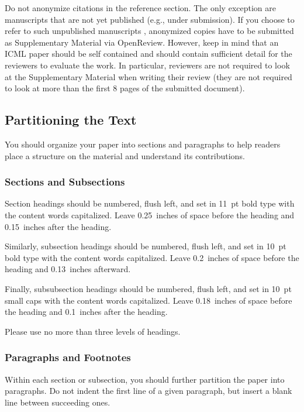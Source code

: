 \documentclass{article}
\theoremstyle{plain}
\theoremstyle{definition}
\theoremstyle{remark}
\begin{document}
Do not anonymize citations in the reference section. The only exception are manuscripts that are
not yet published (e.g., under submission). If you choose to refer to
such unpublished manuscripts \cite{anonymous}, anonymized copies have
to be submitted
as Supplementary Material via OpenReview\@. However, keep in mind that an ICML
paper should be self contained and should contain sufficient detail
for the reviewers to evaluate the work. In particular, reviewers are
not required to look at the Supplementary Material when writing their
review (they are not required to look at more than the first $8$ pages of the submitted document).

\subsection{Partitioning the Text}

You should organize your paper into sections and paragraphs to help
readers place a structure on the material and understand its
contributions.

\subsubsection{Sections and Subsections}

Section headings should be numbered, flush left, and set in 11~pt bold
type with the content words capitalized. Leave 0.25~inches of space
before the heading and 0.15~inches after the heading.

Similarly, subsection headings should be numbered, flush left, and set
in 10~pt bold type with the content words capitalized. Leave
0.2~inches of space before the heading and 0.13~inches afterward.

Finally, subsubsection headings should be numbered, flush left, and
set in 10~pt small caps with the content words capitalized. Leave
0.18~inches of space before the heading and 0.1~inches after the
heading.

Please use no more than three levels of headings.

\subsubsection{Paragraphs and Footnotes}

Within each section or subsection, you should further partition the
paper into paragraphs. Do not indent the first line of a given
paragraph, but insert a blank line between succeeding ones.
\end{document}
